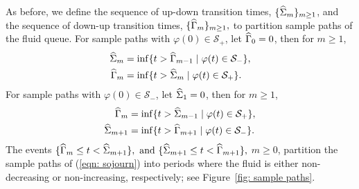 As before, we define the sequence of up-down transition times, \(\{\widehat{\Sigma}_m\}_{m\geq 1}\), and the sequence of down-up transition times, \(\{\widehat{\Gamma}_m\}_{m\geq 1},\) to partition sample paths of the fluid queue. For sample paths with \(\varphi(0)\in\mathcal S_+\), let \(\widehat{\Gamma}_0=0\), then for \(m\geq 1\), 
\begin{align}
	\widehat{\Sigma}_m &=\inf\{t > \widehat{\Gamma}_{m-1} \mid \varphi(t)\in\mathcal S_-\}, 
	\\ \widehat{\Gamma}_m &=\inf\{t > \widehat{\Sigma}_{m} \mid \varphi(t)\in\mathcal S_+\}.
\end{align}
For sample paths with \(\varphi(0)\in\mathcal S_-\), let \(\widehat{\Sigma}_1=0\), then for \(m\geq 1\), 
\begin{align}
	\widehat{\Gamma}_m &=\inf\{t > \widehat{\Sigma}_{m-1} \mid \varphi(t)\in\mathcal S_+\},
	\\\widehat{\Sigma}_{m+1} &=\inf\{t > \widehat{\Gamma}_{m+1} \mid \varphi(t)\in\mathcal S_-\}.
\end{align} 
The events \(\{\widehat{\Gamma}_m\leq t< \widehat{\Sigma}_{m+1}\} , \mbox{ and } \{\widehat{\Sigma}_{m+1}\leq t< \widehat{\Gamma}_{m+1}\}, \) \(m\geq 0\), partition the sample paths of (\ref{eqn: sojourn}) into periods where the fluid is either non-decreasing or non-increasing, respectively; see Figure~\ref{fig: sample paths}.
